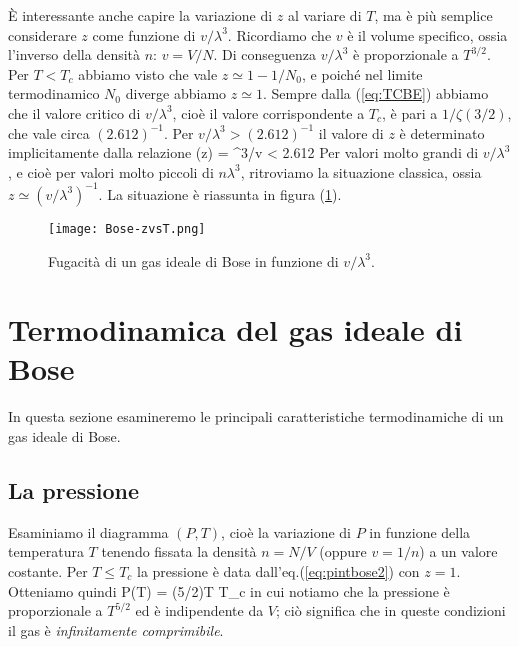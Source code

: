 È interessante anche capire la variazione di $z$ al variare di $T$, ma è più semplice considerare $z$ come funzione di $v/\lambda^3$. Ricordiamo che $v$ è il volume specifico, ossia l'inverso della densità $n$: $v = V/N$. Di conseguenza $v/\lambda^3$ è proporzionale a $T^{3/2}$. Per $T < T_c$ abbiamo visto che vale $z \simeq 1 - 1/N_0$, e poiché nel limite termodinamico $N_0$ diverge abbiamo $z \simeq 1$. Sempre dalla (\ref{eq:TCBE}) abbiamo che il valore critico di $v/\lambda^3$, cioè il valore corrispondente a $T_c$, è pari a $1/\zeta(3/2)$, che vale circa $(2.612)^{-1}$.
Per $v/\lambda^3 > (2.612)^{-1}$ il valore di $z$ è determinato implicitamente dalla relazione
\be
{}(z) = \lambda^3/v < 2.612
\ee
Per valori molto grandi di $v/\lambda^3$, e cioè per valori molto piccoli di $n\lambda^3$, ritroviamo la situazione classica, ossia $z\simeq (v/\lambda^3)^{-1}$. La situazione è riassunta in figura (\ref{fig:zvsT}).
\begin{figure}[!ht]
	\centering
	\texttt{[image: Bose-zvsT.png]}
	\caption{Fugacità di un gas ideale di Bose in funzione di $v/\lambda^3$.}
	\label{fig:zvsT}
\end{figure}

\section{Termodinamica del gas ideale di Bose}

In questa sezione esamineremo le principali caratteristiche termodinamiche di un gas ideale di Bose.

\subsection{La pressione}

Esaminiamo il diagramma $(P,T)$, cioè la variazione di $P$ in funzione della temperatura $T$ tenendo fissata la densità $n = N/V$ (oppure $v = 1/n$) a un valore costante. Per $T \le T_c$ la pressione è data dall'eq.(\ref{eq:pintbose2}) con $z=1$. Otteniamo quindi
\be
\label{eq:pundertc}
P(T) = \zeta(5/2)\quad\quad T \le T_c
\ee
in cui notiamo che la pressione è proporzionale a $T^{5/2}$ ed è indipendente da $V$; ciò significa che in queste condizioni il gas è {\em infinitamente comprimibile}.

